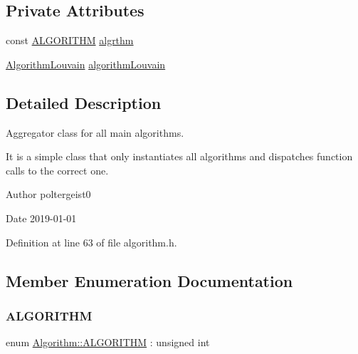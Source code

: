 \subsection*{Private Attributes}
\begin{DoxyCompactItemize}
\item 
const \hyperlink{classAlgorithm_a38e19a8c3dc51b97563a34d9e59a748d}{A\+L\+G\+O\+R\+I\+T\+HM} \hyperlink{classAlgorithm_aaee2fd7b239cc8721ec894716271dcd9}{algrthm}
\item 
\hyperlink{classAlgorithmLouvain}{Algorithm\+Louvain} \hyperlink{classAlgorithm_a95ef62342279e55525eacf34e83bc2ca}{algorithm\+Louvain}
\end{DoxyCompactItemize}


\subsection{Detailed Description}
Aggregator class for all main algorithms. 

It is a simple class that only instantiates all algorithms and dispatches function calls to the correct one.

\begin{DoxyAuthor}{Author}
poltergeist0
\end{DoxyAuthor}
\begin{DoxyDate}{Date}
2019-\/01-\/01 
\end{DoxyDate}


Definition at line 63 of file algorithm.\+h.



\subsection{Member Enumeration Documentation}
\mbox{\label{classAlgorithm_a38e19a8c3dc51b97563a34d9e59a748d}} 
\subsubsection{\texorpdfstring{A\+L\+G\+O\+R\+I\+T\+HM}{ALGORITHM}}
{\footnotesize\ttfamily enum \hyperlink{classAlgorithm_a38e19a8c3dc51b97563a34d9e59a748d}{Algorithm\+::\+A\+L\+G\+O\+R\+I\+T\+HM} \+: unsigned int\hspace{0.3cm}{\ttfamily [strong]}}

